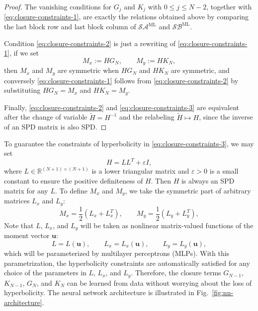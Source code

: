\documentclass[11pt]{article}
\numberwithin{equation}{section}
\newcommand{\R}{\mathbb{R}}
\newcommand{\vect}[1]{\boldsymbol{#1}}
\newcommand{\half}{\frac{1}{2}}
\begin{document}
\begin{proof}
The vanishing conditions for $G_j$ and $K_j$ with $0\le j\le N-2$, together with \eqref{eq:closure-constraints-1}, are exactly the relations obtained above by comparing the last block row and last block column of $\mathcal{S}\mathcal{A}^{\textrm{ML}}$ and $\mathcal{S}\mathcal{B}^{\textrm{ML}}$.

Condition \eqref{eq:closure-constraints-2} is just a rewriting of \eqref{eq:closure-constraints-1}, if we set
\begin{equation}    
    M_x:=HG_N, \qquad M_y:=HK_N,
\end{equation}
then $M_x$ and $M_y$ are symmetric when $HG_N$ and $HK_N$ are symmetric, and conversely \eqref{eq:closure-constraints-1} follows from
\eqref{eq:closure-constraints-2} by substituting $HG_N=M_x$ and $HK_N=M_y$.

Finally, \eqref{eq:closure-constraints-2} and \eqref{eq:closure-constraints-3}
are equivalent after the change of variable $\widetilde H=H^{-1}$ and the
relabeling $\widetilde H\mapsto H$, since the inverse of an SPD matrix is also
SPD.
\end{proof}

To guarantee the constraints of hyperbolicity in \eqref{eq:closure-constraints-3}, we may set
\begin{equation}
H = LL^T + \varepsilon I,
\end{equation}
where $L\in \R^{(N+1)\times(N+1)}$ is a lower triangular matrix and $\varepsilon>0$ is a small constant to ensure the positive definiteness of $H$. Then $H$ is always an SPD matrix for any $L$. To define $M_x$ and $M_y$, we take the symmetric part of arbitrary matrices $L_x$ and $L_y$:
\begin{equation}
    M_x = \half(L_x + L_x^T),
    \qquad
    M_y = \half(L_y + L_y^T),
\end{equation}
Note that $L$, $L_x$, and $L_y$ will be taken as nonlinear matrix-valued functions of the moment vector $\vect{u}$:
\begin{equation}
L = L(\vect{u}),\qquad
L_x = L_x(\vect{u}),\qquad
L_y = L_y(\vect{u}),
\end{equation}
which will be parameterized by multilayer perceptrons (MLPs). With this parametrization, the hyperbolicity constraints are automatically satisfied for any choice of the parameters in $L$, $L_x$, and $L_y$. Therefore, the closure terms $G_{N-1}$, $K_{N-1}$, $G_N$, and $K_N$ can be learned from data without worrying about the loss of hyperbolicity. The neural network architecture is illustrated in Fig.~\ref{fig:nn-architecture}.
\end{document}
